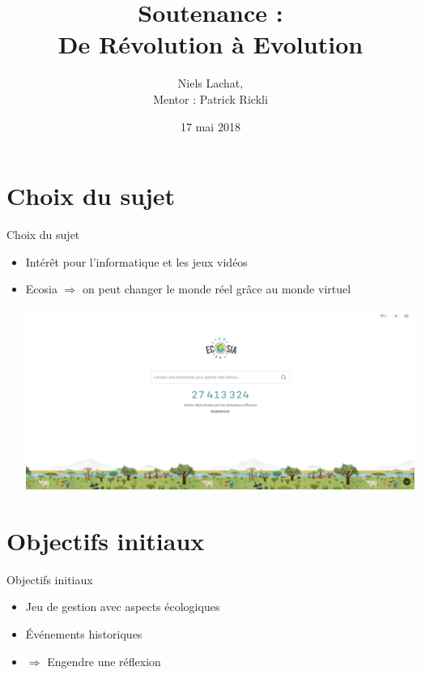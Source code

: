 \documentclass[11pt]{beamer}
\author{Niels Lachat, \\ Mentor : Patrick Rickli}
\title{Soutenance : \\ De Révolution à Evolution}
\institute{Lycée Denis-de-Rougemont}
\date{17 mai 2018}
\newcommand{\pauseditemize}{\pause \begin{itemize}[<+->]}
\begin{document}
\begin{frame}
\titlepage
\end{frame}

\begin{frame}
\tableofcontents
\end{frame}

\section{Choix du sujet}

\begin{frame}{Choix du sujet}

\pauseditemize
	\item Intérêt pour l'informatique et les jeux vidéos
	\item Ecosia $\Rightarrow$ on peut changer le monde réel grâce au monde virtuel
	\begin{center}
		\includegraphics[scale=.1]{../images/ecosia}
	\end{center}
\end{itemize}

\end{frame}


\section{Objectifs initiaux}

\begin{frame}{Objectifs initiaux}

\pauseditemize
	\item Jeu de gestion avec aspects écologiques
	\item Événements historiques
	\item $\Rightarrow$ Engendre une réflexion
\end{itemize}

\end{frame}
\end{document}
